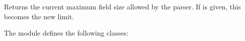\documentclass[letterpaper,10pt,english]{sphinxmanual}
\begin{document}

\vspace{5px}

\begin{fulllineitems}
\label{\detokenize{csv:csv.field_size_limit}}
Returns the current maximum field size allowed by the parser. If  is
given, this becomes the new limit.

\end{fulllineitems}


The {\hyperref[\detokenize{csv:module-csv}]{}} module defines the following classes:

\vspace{5px}
\end{document}
